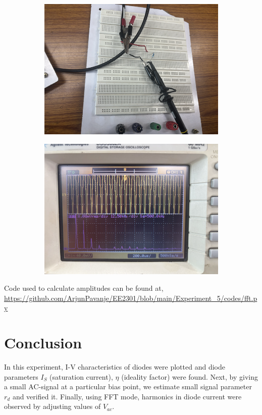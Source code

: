 \documentclass[12pt,a4paper]{article}
\begin{document}
\begin{figure}[h!]
\centering
\begin{subfigure}[b]{0.47\linewidth}
    \centering
    \includegraphics[width=\textwidth]{Experiment_5/figs/FFT_ckt.png}
\end{subfigure}
\begin{subfigure}[b]{0.48\linewidth}
    \centering
    \includegraphics[width=\textwidth]{Experiment_5/figs/FFT_osc.png}
\end{subfigure}
\end{figure}
Code used to calculate amplitudes can be found at, \url{https://github.com/ArjunPavanje/EE2301/blob/main/Experiment_5/codes/fft.py}
\section{Conclusion}
In this experiment, I-V characteristics of diodes were plotted and diode parameters $I_S$ (saturation current), $\eta$ (ideality factor) were found. Next, by giving a small AC-signal at a particular bias point, we estimate small signal parameter $r_d$ and verified it. Finally, using FFT mode, harmonics in diode current were observed by adjusting values of $V_{ac}$.
\end{document}
